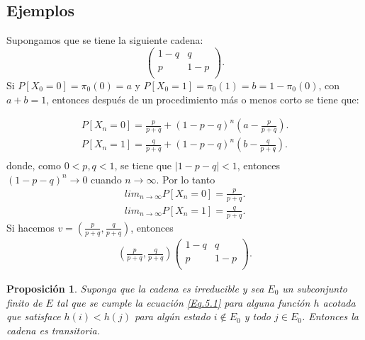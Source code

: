 \documentclass{article}
\newtheorem{Prop}{Proposición}[section]
\numberwithin{equation}{section}
\begin{document}
\subsection*{Ejemplos}

Supongamos que se tiene la siguiente cadena:
\begin{equation}
\left(\begin{array}{cc}
1-q & q\\
p & 1-p\\
\end{array}
\right).
\end{equation}
Si $P\left[X_{0}=0\right]=\pi_{0}(0)=a$ y $P\left[X_{0}=1\right]=\pi_{0}(1)=b=1-\pi_{0}(0)$, con $a+b=1$, entonces despu\'es de un procedimiento m\'as o menos corto se tiene que:

\begin{eqnarray*}
P\left[X_{n}=0\right]=\frac{p}{p+q}+\left(1-p-q\right)^{n}\left(a-\frac{p}{p+q}\right).\\
P\left[X_{n}=1\right]=\frac{q}{p+q}+\left(1-p-q\right)^{n}\left(b-\frac{q}{p+q}\right).\\
\end{eqnarray*}
donde, como $0<p,q<1$, se tiene que $|1-p-q|<1$, entonces $\left(1-p-q\right)^{n}\rightarrow 0$ cuando $n\rightarrow\infty$. Por lo tanto
\begin{eqnarray*}
lim_{n\rightarrow\infty}P\left[X_{n}=0\right]=\frac{p}{p+q}.\\
lim_{n\rightarrow\infty}P\left[X_{n}=1\right]=\frac{q}{p+q}.
\end{eqnarray*}
Si hacemos $v=\left(\frac{p}{p+q},\frac{q}{p+q}\right)$, entonces
\begin{eqnarray*}
\left(\frac{p}{p+q},\frac{q}{p+q}\right)\left(\begin{array}{cc}
1-q & q\\
p & 1-p\\
\end{array}\right).
\end{eqnarray*}

\begin{Prop}\label{Prop.5.4}
Suponga que la cadena es irreducible y sea $E_{0}$ un subconjunto finito de $E$ tal que se cumple la ecuaci\'on \ref{Eq.5.1} para alguna funci\'on $h$ acotada que satisface $h\left(i\right)<h\left(j\right)$ para alg\'un estado $i\notin E_{0}$ y todo $j\in E_{0}$. Entonces la cadena es transitoria.
\end{Prop}
\end{document}
